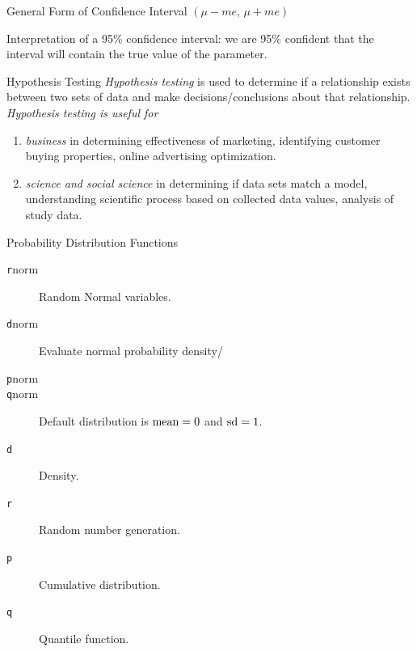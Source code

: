 \documentclass[xcolor=svgnames, 10pt, handout]{beamer}
\begin{document}
\begin{frame}[fragile]
\vfill
\begin{block}{General Form of Confidence Interval}
\hfill$(\mu-me,\, \mu+me)$\hfill\hfill
\end{block}
\vfill
Interpretation of a 95\% confidence interval: we are 95\% confident that the interval will contain the true value of the parameter.
\vfill
\end{frame}


\begin{frame}[fragile]{Hypothesis Testing}
\emph{Hypothesis testing} is used to determine if a relationship exists between two sets of data and make decisions/conclusions about that relationship.
\vfill
\emph{Hypothesis testing is useful for}
\begin{enumerate}
\item \emph{business} in determining effectiveness of marketing, identifying customer buying properties, online advertising optimization.
\item \emph{science and social science} in determining if data sets match a model, understanding scientific process based on collected data values, analysis of study data.
\end{enumerate}
\vfill
\end{frame}


\begin{frame}[fragile]{Probability Distribution Functions}
\begin{description}
\item[\texttt rnorm] Random Normal variables.
\item[\texttt dnorm] Evaluate normal probability density/
\item[\texttt pnorm] 
\item[\texttt qnorm] Default distribution is ${\rm mean}=0$ and ${\rm sd}=1$.
\item[\texttt d] Density.
\item[\texttt r] Random number generation.
\item[\texttt p] Cumulative distribution.
\item[\texttt q] Quantile function.
\end{description}
\end{frame}
\end{document}
